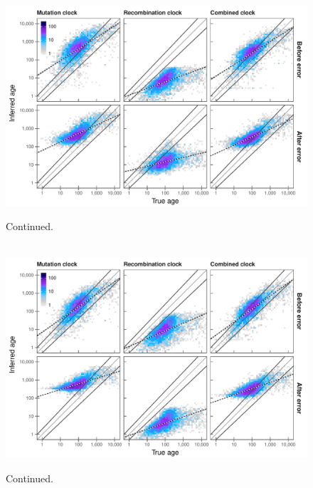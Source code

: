 \begin{figure}[!htb]
\ContinuedFloat
{\,\small{}} \\
\includegraphics[width=\textwidth]{./img/ch5/generror_scat_dgt}
\caption[]{Continued.}
\label{fig:generror_scat_dgt}
\end{figure}


\begin{figure}[!htb]
\ContinuedFloat
{\,\small{}} \\
\includegraphics[width=\textwidth]{./img/ch5/generror_scat_hmm}
\caption[]{Continued.}
\label{fig:generror_scat_hmm}
\end{figure}
